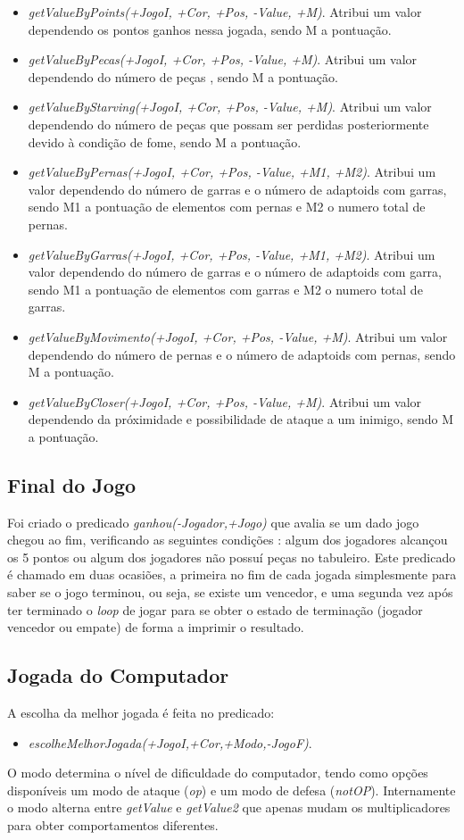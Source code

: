 \documentclass[a4paper]{article}
\begin{document}
\begin{itemize}
    \item \textit{getValueByPoints(+JogoI, +Cor, +Pos, -Value, +M)}. Atribui um valor dependendo os pontos ganhos nessa jogada, sendo M a pontuação.
    \item \textit{getValueByPecas(+JogoI, +Cor, +Pos, -Value, +M)}. Atribui um valor dependendo do número de peças , sendo M a pontuação.
    \item \textit{getValueByStarving(+JogoI, +Cor, +Pos, -Value, +M)}. Atribui um valor dependendo do número de peças que possam ser perdidas posteriormente devido à condição de fome, sendo M a pontuação.
    \item \textit{getValueByPernas(+JogoI, +Cor, +Pos, -Value, +M1, +M2)}. Atribui um valor dependendo do número de garras e o número de adaptoids com garras, sendo M1 a pontuação de elementos com pernas e M2 o numero total de pernas.
    \item \textit{getValueByGarras(+JogoI, +Cor, +Pos, -Value, +M1, +M2)}. Atribui um valor dependendo do número de garras e o número de adaptoids com garra, sendo M1 a pontuação de elementos com garras e M2 o numero total de garras.
    \item \textit{getValueByMovimento(+JogoI, +Cor, +Pos, -Value, +M)}. Atribui um valor dependendo do número de pernas e o número de adaptoids com pernas, sendo M a pontuação.
    \item \textit{getValueByCloser(+JogoI, +Cor, +Pos, -Value, +M)}. Atribui um valor dependendo da próximidade e possibilidade de ataque a um inimigo, sendo M a pontuação.
\end{itemize}

\subsection{Final do Jogo} Foi criado o predicado \textit{ganhou(-Jogador,+Jogo)} que avalia se um dado jogo chegou ao fim, verificando as seguintes condições : algum dos jogadores alcançou os 5 pontos ou algum dos jogadores não possuí peças no tabuleiro. Este predicado é chamado em duas ocasiões, a primeira no fim de cada jogada simplesmente para saber se o jogo terminou, ou seja, se existe um vencedor, e uma segunda vez após ter terminado o \textit{loop} de jogar para se obter o estado de terminação (jogador vencedor ou empate) de forma a imprimir o resultado.

\subsection{Jogada do Computador}
A escolha da melhor jogada é feita no predicado: 
\begin{itemize}
	\item \textit{escolheMelhorJogada(+JogoI,+Cor,+Modo,-JogoF)}.
\end{itemize}
O modo determina o nível de dificuldade do computador, tendo como opções disponíveis um modo de ataque (\textit{op}) e um modo de defesa (\textit{notOP}). Internamente o modo alterna entre \textit{getValue} e \textit{getValue2} que apenas mudam os multiplicadores para obter comportamentos diferentes.
\end{document}
